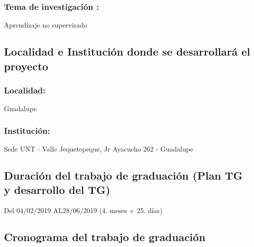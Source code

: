 \documentclass[a4paper, 12pt]{article}
\begin{document}
\subsubsection{Tema de investigación :} 
Aprendizaje no supervisado


\subsection{Localidad e Institución donde se desarrollará el proyecto }
  
\subsubsection{Localidad:}
Guadalupe 
\subsubsection{Institución:}
Sede UNT - Valle Jequetepeque, Jr Ayacucho 262 - Guadalupe
  
\subsection{Duración del trabajo de graduación (Plan TG y desarrollo del TG)}
\hspace*{0.7cm}Del \hspace*{0.2cm}04/02/2019 \hspace*{0.3cm} AL\hspace*{0.2cm}28/06/2019  \hspace*{0.2cm}(4. meses +  25. días)
  
      
\subsection{Cronograma del trabajo de graduación}


\end{document}
